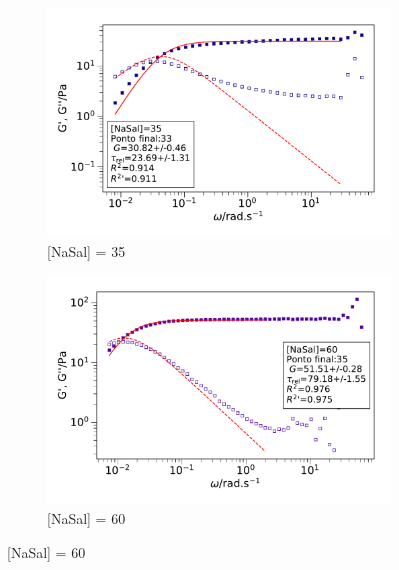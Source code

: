 		\begin{figure}[h]
			\begin{subfigure}[t]{0.5\textwidth}
				\includegraphics[width=\textwidth]{imagens/reologia/oscilatorio_agua_35}
				\caption{[NaSal] = 35 \mM}
				\label{fig:oscilatorio_agua_35}
			\end{subfigure} %
			\begin{subfigure}[t]{0.5\textwidth}
				\centering
				\includegraphics[width=\textwidth]{imagens/reologia/oscilatorio_agua_60}
				\caption{[NaSal] = 60 \mM}
				\label{fig:oscilatorio_agua_60}
			\end{subfigure}
			

\end{figure}

